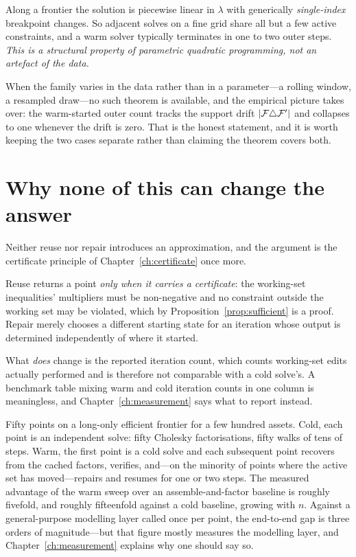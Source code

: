 Along a frontier the solution is piecewise linear in $\lambda$ with generically
\emph{single-index} breakpoint changes. So adjacent solves on a fine grid share all but
a few active constraints, and a warm solver typically terminates in one to two outer
steps. \emph{This is a structural property of parametric quadratic programming, not an
artefact of the data.}

When the family varies in the data rather than in a parameter---a rolling window, a
resampled draw---no such theorem is available, and the empirical picture takes over: the
warm-started outer count tracks the support drift $|\mathcal{F} \triangle \mathcal{F}'|$ and
collapses to one whenever the drift is zero. That is the honest statement, and it is
worth keeping the two cases separate rather than claiming the theorem covers both.

\section{Why none of this can change the answer}

Neither reuse nor repair introduces an approximation, and the argument is the
certificate principle of Chapter~\ref{ch:certificate} once more.

Reuse returns a point \emph{only when it carries a certificate}: the working-set
inequalities' multipliers must be non-negative and no constraint outside the working set
may be violated, which by Proposition~\ref{prop:sufficient} is a proof. Repair merely
chooses a different starting state for an iteration whose output is determined
independently of where it started.

What \emph{does} change is the reported iteration count, which counts working-set edits
actually performed and is therefore not comparable with a cold solve's. A benchmark
table mixing warm and cold iteration counts in one column is meaningless, and
Chapter~\ref{ch:measurement} says what to report instead.

\begin{example}
Fifty points on a long-only efficient frontier for a few hundred assets. Cold, each
point is an independent solve: fifty Cholesky factorisations, fifty walks of tens of
steps. Warm, the first point is a cold solve and each subsequent point recovers from the
cached factors, verifies, and---on the minority of points where the active set has
moved---repairs and resumes for one or two steps. The measured advantage of the warm
sweep over an assemble-and-factor baseline is roughly fivefold, and roughly fifteenfold
against a cold baseline, growing with $n$. Against a general-purpose modelling layer
called once per point, the end-to-end gap is three orders of magnitude---but that figure
mostly measures the modelling layer, and Chapter~\ref{ch:measurement} explains why one
should say so.
\end{example}

